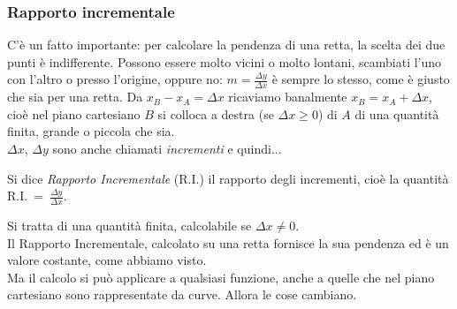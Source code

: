 \subsubsection{Rapporto incrementale}
\label{subsubsec:diff01_rappincr}
C'è un fatto importante: per calcolare la pendenza di una retta, 
la scelta dei due punti è indifferente. Possono essere molto vicini o molto 
lontani, scambiati l'uno con l'altro o presso l'origine, oppure no:
$m=\frac{\Delta y}{\Delta x}$ è sempre lo stesso, come è giusto che sia per 
una retta.
Da $x_B-x_A=\Delta x$ ricaviamo banalmente $x_B=x_A+\Delta x$, cioè nel 
piano 
cartesiano
$B$ si colloca a destra (se $\Delta x\ge 0$) di $A$ di una quantità finita,
grande o piccola che sia.\\
$\Delta x$, $\Delta y$ sono anche chiamati \emph{incrementi} e quindi...
\begin{definizione}
  Si dice \emph{Rapporto Incrementale} (R.I.) il rapporto degli
  incrementi, cioè la quantità R.I.~=~$\frac{\Delta y}{\Delta x}$.
\end{definizione}
Si tratta di una quantità finita, calcolabile se $\Delta x \ne 0$.\\
Il Rapporto Incrementale, calcolato su una retta fornisce la sua pendenza 
ed 
è un valore costante, come abbiamo visto.\\
Ma il calcolo si può applicare a qualsiasi funzione, anche a quelle che nel 
piano cartesiano sono rappresentate da curve. Allora le cose cambiano.\\

